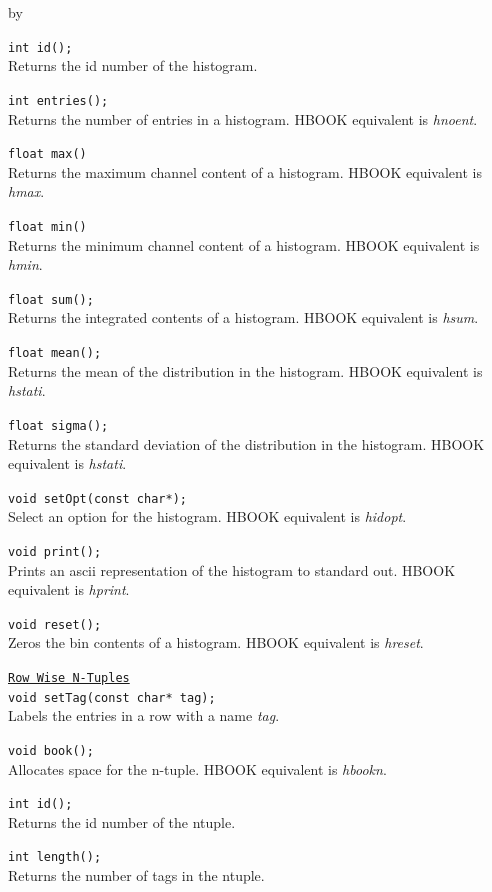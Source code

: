 \documentclass[twoside]{article}
\newcommand{\comp}[1]{\texttt{#1}}%
\newcommand{\entrylabel}[1]{\mbox{\textbf{{#1}}}\hfil}%
\newenvironment{entry}
{\begin{list}{}%
    {\renewcommand{\makelabel}{\entrylabel}%
     \setlength{\labelwidth}{90pt}%
     \setlength{\leftmargin}{\labelwidth}
     \advance\leftmargin by \labelsep%
      }%
    }%
  {\end{list}}
\newcommand{\Entrylabel}[1]%
{\raisebox{0pt}[1ex][0pt]{\makebox[\labelwidth][l]%
    {\parbox[t]{\labelwidth}{\hspace{0pt}\textbf{{#1}}}}}}
\newenvironment{Entry}%
{\renewcommand{\entrylabel}{\Entrylabel}\begin{entry}}%
  {\end{entry}}
\begin{document}
\begin{description}
\begin{Entry}
  \verb+int id();+\\
  Returns the id number of the histogram. 

  \verb+int entries();+\\
  Returns the number of entries in a histogram.  HBOOK equivalent
  is {\em  hnoent}.
  
  \verb+float max()+\\
  Returns the maximum channel content of a histogram.  HBOOK equivalent
  is {\em hmax}.

  \verb+float min()+\\
  Returns the minimum channel content of a histogram.  HBOOK equivalent
  is {\em hmin}.
  
  \verb+float sum();+\\
  Returns the integrated contents of a histogram.  HBOOK equivalent
  is {\em hsum}.

  \verb+float mean();+\\
  Returns the mean of the distribution in the histogram.
  HBOOK equivalent is {\em hstati}.
  
  \verb+float sigma();+\\
  Returns the standard deviation of the distribution in the histogram.
  HBOOK equivalent is {\em hstati}.
  
  \verb+void setOpt(const char*);+\\
  Select an option for the histogram.  HBOOK equivalent is {\em hidopt}.
  
  \verb+void print();+\\
  Prints an ascii representation of the histogram to standard out.
  HBOOK equivalent is {\em hprint}.
  
  \verb+void reset();+\\
  Zeros the bin contents of a histogram.  HBOOK equivalent is {\em hreset}.

  \comp{\underline{Row Wise N-Tuples}}\\
  \verb+void setTag(const char* tag);+\\
  Labels the entries in a row with a name {\em tag}.
  
  \verb+void book();+\\
  Allocates space for the n-tuple.  HBOOK equivalent is {\em hbookn}.
  
  \verb+int id();+\\
  Returns the id number of the ntuple.

  \verb+int length();+\\
  Returns the number of tags in the ntuple.
  

\end{Entry}
\end{description}
\end{document}
